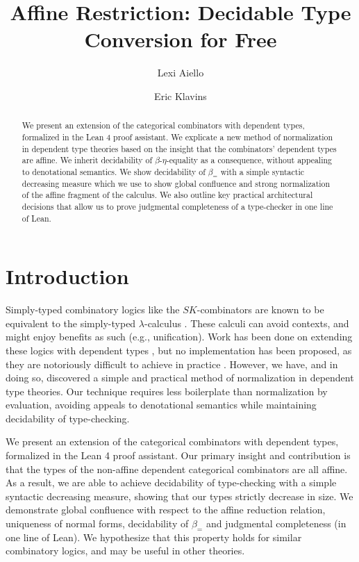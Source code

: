 \documentclass{article}
\title{Affine Restriction: Decidable Type Conversion for Free}
\author[1]{Lexi Aiello}
\author[2]{Eric Klavins}
\affil[1]{Department of Philosophy, University of Washington}
\affil[2]{Electrical \& Computer Engineering Department, University of Washington}
\begin{document}
\maketitle
\begin{abstract}
  We present an extension of the categorical combinators \autocite{CURIEN1986188} with dependent types, formalized in the Lean 4 proof assistant. We explicate a new method of normalization in dependent type theories based on the insight that the combinators' dependent types are affine. We inherit decidability of \(\beta\)-\(\eta\)-equality as a consequence, without appealing to denotational semantics. We show decidability of \(\beta_{=}\) with a simple syntactic decreasing measure which we use to show global confluence and strong normalization of the affine fragment of the calculus. We also outline key practical architectural decisions that allow us to prove judgmental completeness of a type-checker in one line of Lean.
\end{abstract}

\section{Introduction}

Simply-typed combinatory logics like the \(SK\)-combinators are known to be equivalent to the simply-typed \(\lambda\)-calculus \autocite{Altenkirch2023CombinatoryLA}. These calculi can avoid contexts, and might enjoy benefits as such (e.g., unification). Work has been done on extending these logics with dependent types \autocite{altenkirch}, but no implementation has been proposed, as they are notoriously difficult to achieve in practice \autocite[p. 10:14]{altenkirch}. However, we have, and in doing so, discovered a simple and practical method of normalization in dependent type theories. Our technique requires less boilerplate than normalization by evaluation, avoiding appeals to denotational semantics while maintaining decidability of type-checking.

We present an extension of the categorical combinators with dependent types, formalized in the Lean 4 proof assistant. Our primary insight and contribution is that the types of the non-affine dependent categorical combinators are all affine. As a result, we are able to achieve decidability of type-checking with a simple syntactic decreasing measure, showing that our types strictly decrease in size. We demonstrate global confluence with respect to the affine reduction relation, uniqueness of normal forms, decidability of \(\beta_{=}\) and judgmental completeness (in one line of Lean). We hypothesize that this property holds for similar combinatory logics, and may be useful in other theories.
\end{document}
